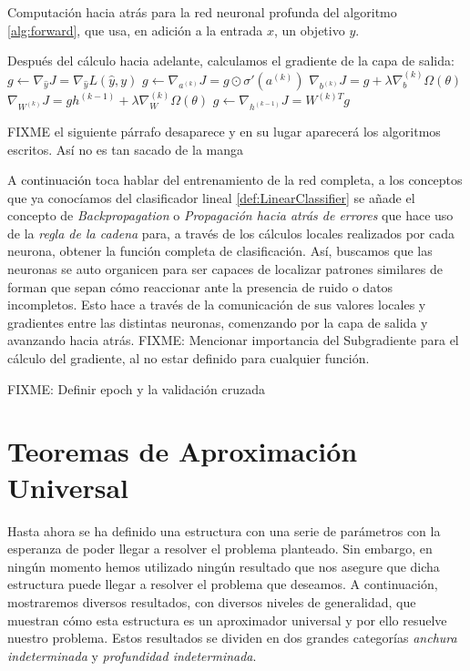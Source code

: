 \begin{algorithm}
\caption{Computación hacia atrás para la red neuronal profunda del algoritmo \autoref{alg:forward}, que usa, en adición a la entrada $x$, un objetivo $y$.}
\begin{algorithmic}
\STATE Después del cálculo hacia adelante, calculamos el gradiente de la capa de salida:
\STATE $g\leftarrow\nabla_{\hat{y}}J=\nabla_{\hat{y}}L(\hat{y},y)$
\STATE $g\leftarrow \nabla_{a^(k)}J=g\odot\sigma'(a^{(k)})$
\STATE $\nabla_{b^{(k)}}J=g+\lambda\nabla_b^(k)\Omega(\theta)$
\STATE $\nabla_{W^{(k)}}J=gh^{(k-1)}+\lambda\nabla_W^{(k)}\Omega(\theta)$
\STATE $g\leftarrow \nabla_{h^{(k-1)}}J=W^{(k)T}g$
\ENDFOR
\end{algorithmic}
\end{algorithm}
FIXME el siguiente párrafo desaparece y en su lugar aparecerá los algoritmos escritos. Así no es tan sacado de la manga

A continuación toca hablar del entrenamiento de la red completa, a los conceptos que ya conocíamos del clasificador lineal \ref{def:LinearClassifier} se añade el concepto de \emph{Backpropagation} o \emph{Propagación hacia atrás de errores} que hace uso de la \emph{regla de la cadena} para, a través de los cálculos locales realizados por cada neurona, obtener la función completa de clasificación. Así, buscamos que las neuronas se auto organicen para ser capaces de localizar patrones similares de forman que sepan cómo reaccionar ante la presencia de ruido o datos incompletos. Esto hace a través de la comunicación de sus valores locales y gradientes entre las distintas neuronas, comenzando por la capa de salida y avanzando hacia atrás. FIXME: Mencionar importancia del Subgradiente para el cálculo del gradiente, al no estar definido para cualquier función. \newline

FIXME: Definir epoch y la validación cruzada

\chapter{Teoremas de Aproximación Universal}
Hasta ahora se ha definido una estructura con una serie de parámetros con la esperanza de poder llegar a resolver el problema planteado. Sin embargo, en ningún momento hemos utilizado ningún resultado que nos asegure que dicha estructura puede llegar a resolver el problema que deseamos. A continuación, mostraremos diversos resultados, con diversos niveles de generalidad, que muestran cómo esta estructura es un aproximador universal y por ello resuelve nuestro problema. Estos resultados se dividen en dos grandes categorías \emph{anchura indeterminada} y \emph{profundidad indeterminada}.


